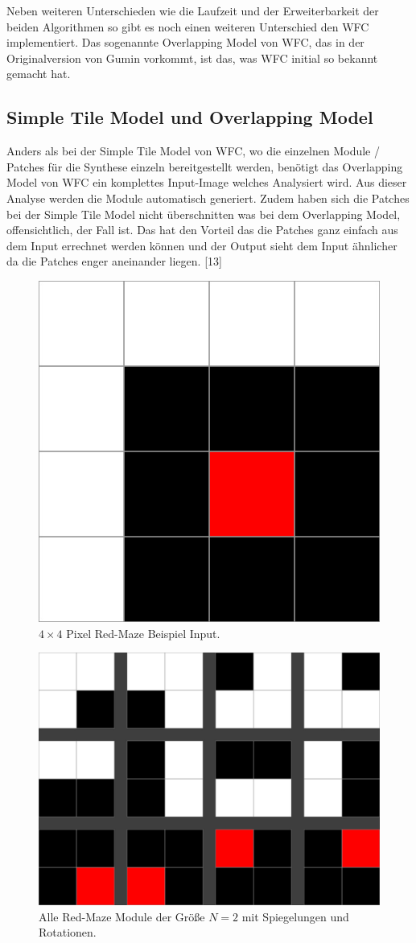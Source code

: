 \documentclass[12pt, a4paper,twoside,openright]{report}
\begin{document}
Neben weiteren Unterschieden wie die Laufzeit und der Erweiterbarkeit der beiden Algorithmen so gibt es noch einen weiteren Unterschied den WFC implementiert.
Das sogenannte Overlapping Model von WFC, das in der Originalversion von Gumin vorkommt, ist das, was WFC initial so bekannt gemacht hat.

\subsection{Simple Tile Model und Overlapping Model}

Anders als bei der Simple Tile Model von WFC, wo die einzelnen Module / Patches für die Synthese einzeln bereitgestellt werden,
benötigt das Overlapping Model von WFC ein komplettes Input-Image welches Analysiert wird.
Aus dieser Analyse werden die Module automatisch generiert.
Zudem haben sich die Patches bei der Simple Tile Model nicht überschnitten was bei dem Overlapping Model, offensichtlich, der Fall ist.
Das hat den Vorteil das die Patches ganz einfach aus dem Input errechnet werden können und der Output sieht dem Input ähnlicher da die Patches enger aneinander liegen. {[13]}

\begin{figure}[H]
    \centering
    \includegraphics[width=0.5\linewidth]{images/red-maze.jpg}%
    \caption{$4\times 4$ Pixel Red-Maze Beispiel Input.}%
\end{figure}


\begin{figure}[H]
    \centering
    \includegraphics[width=0.5\linewidth]{images/red-maze-modules.jpg}%
    \caption{Alle Red-Maze Module der Größe $N = 2$ mit Spiegelungen und Rotationen.}%
\end{figure}
\end{document}

